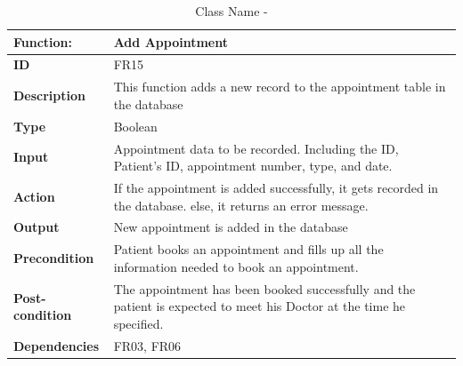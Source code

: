 \documentclass[]{article}
\begin{document}
\begin{table}[h]
\caption{Class Name - }
\label{tab:my-table}
\begin{tabular}{|p{}|p{}|}
\hline
\textbf{Function:} & Add Appointment
\\ \hline
\textbf{ID}  &   FR15         

\\ \hline
\textbf{Description}    & This function adds a new record to the appointment table in the database                                                                    
\\ \hline
\textbf{Type}    &   Boolean      

\\ \hline
\textbf{Input}        & Appointment data to be recorded. Including the ID, Patient's ID, appointment number, type, and date.


\\ \hline
\textbf{Action}            & If the appointment is added successfully, it gets recorded in the database. else, it returns an error message.

\\ \hline
\textbf{Output}            & New appointment is added in the database

\\ \hline
\textbf{Precondition}           &  Patient books an appointment and fills up all the information needed to book an appointment. 

\\ \hline
\textbf{Post-condition}           & The appointment has been booked successfully and the patient is expected to meet his Doctor at the time he specified.


\\ \hline
\textbf{Dependencies}           & FR03, FR06 
\\ \hline
\end{tabular}
\end{table}
\end{document}
